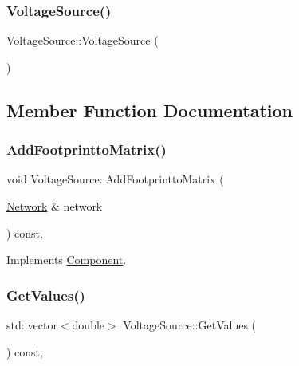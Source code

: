 \subsubsection{\texorpdfstring{Voltage\+Source()}{VoltageSource()}}
{\footnotesize\ttfamily Voltage\+Source\+::\+Voltage\+Source (\begin{DoxyParamCaption}{ }\end{DoxyParamCaption})}



\subsection{Member Function Documentation}
\mbox{\label{classVoltageSource_a74f8a6a57480e9cff24414e106d2bbf1}} 
\subsubsection{\texorpdfstring{Add\+Footprintto\+Matrix()}{AddFootprinttoMatrix()}}
{\footnotesize\ttfamily void Voltage\+Source\+::\+Add\+Footprintto\+Matrix (\begin{DoxyParamCaption}\item[{\hyperlink{classNetwork}{Network} \&}]{network }\end{DoxyParamCaption}) const\hspace{0.3cm}{\ttfamily [override]}, {\ttfamily [virtual]}}



Implements \hyperlink{classComponent_a833d40a0f50c3c06dcab2e035b758e6f}{Component}.

\mbox{\label{classVoltageSource_addf30a4714e13d83fd5a18e6d9a4310b}} 
\subsubsection{\texorpdfstring{Get\+Values()}{GetValues()}}
{\footnotesize\ttfamily std\+::vector$<$double$>$ Voltage\+Source\+::\+Get\+Values (\begin{DoxyParamCaption}{ }\end{DoxyParamCaption}) const\hspace{0.3cm}{\ttfamily [override]}, {\ttfamily [virtual]}}



